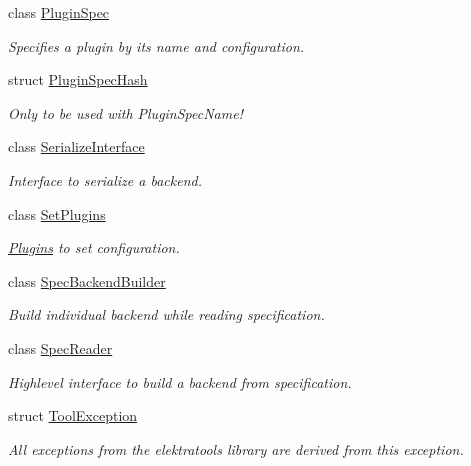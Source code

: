\begin{DoxyCompactItemize}
class \mbox{\hyperlink{classkdb_1_1tools_1_1PluginSpec}{Plugin\+Spec}}
\begin{DoxyCompactList}\small\item\em Specifies a plugin by its name and configuration. \end{DoxyCompactList}\item 
struct \mbox{\hyperlink{structkdb_1_1tools_1_1PluginSpecHash}{Plugin\+Spec\+Hash}}
\begin{DoxyCompactList}\small\item\em Only to be used with Plugin\+Spec\+Name! \end{DoxyCompactList}\item 
class \mbox{\hyperlink{classkdb_1_1tools_1_1SerializeInterface}{Serialize\+Interface}}
\begin{DoxyCompactList}\small\item\em Interface to serialize a backend. \end{DoxyCompactList}\item 
class \mbox{\hyperlink{classkdb_1_1tools_1_1SetPlugins}{Set\+Plugins}}
\begin{DoxyCompactList}\small\item\em \mbox{\hyperlink{classkdb_1_1tools_1_1Plugins}{Plugins}} to set configuration. \end{DoxyCompactList}\item 
class \mbox{\hyperlink{classkdb_1_1tools_1_1SpecBackendBuilder}{Spec\+Backend\+Builder}}
\begin{DoxyCompactList}\small\item\em Build individual backend while reading specification. \end{DoxyCompactList}\item 
class \mbox{\hyperlink{classkdb_1_1tools_1_1SpecReader}{Spec\+Reader}}
\begin{DoxyCompactList}\small\item\em Highlevel interface to build a backend from specification. \end{DoxyCompactList}\item 
struct \mbox{\hyperlink{structkdb_1_1tools_1_1ToolException}{Tool\+Exception}}
\begin{DoxyCompactList}\small\item\em All exceptions from the elektratools library are derived from this exception. \end{DoxyCompactList}\end{DoxyCompactItemize}
